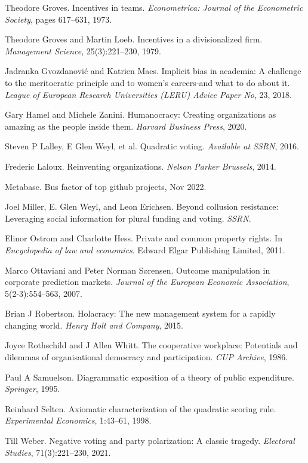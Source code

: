 \documentclass{article}
\begin{document}
\begin{thebibliography}{99}
Theodore Groves. Incentives in teams. \textit{Econometrica: Journal of the Econometric Society}, pages 617--631, 1973.

Theodore Groves and Martin Loeb. Incentives in a divisionalized firm. \textit{Management Science}, 25(3):221--230, 1979.

Jadranka Gvozdanović and Katrien Maes. Implicit bias in academia: A challenge to the meritocratic principle and to women's careers-and what to do about it. \textit{League of European Research Universities (LERU) Advice Paper No}, 23, 2018.

Gary Hamel and Michele Zanini. Humanocracy: Creating organizations as amazing as the people inside them. \textit{Harvard Business Press}, 2020.

Steven P Lalley, E Glen Weyl, et al. Quadratic voting. \textit{Available at SSRN}, 2016.

Frederic Laloux. Reinventing organizations. \textit{Nelson Parker Brussels}, 2014.

Metabase. Bus factor of top github projects, Nov 2022.

Joel Miller, E. Glen Weyl, and Leon Erichsen. Beyond collusion resistance: Leveraging social information for plural funding and voting. \textit{SSRN}.

Elinor Ostrom and Charlotte Hess. Private and common property rights. In \textit{Encyclopedia of law and economics}. Edward Elgar Publishing Limited, 2011.

Marco Ottaviani and Peter Norman Sørensen. Outcome manipulation in corporate prediction markets. \textit{Journal of the European Economic Association}, 5(2-3):554--563, 2007.

Brian J Robertson. Holacracy: The new management system for a rapidly changing world. \textit{Henry Holt and Company}, 2015.

Joyce Rothschild and J Allen Whitt. The cooperative workplace: Potentials and dilemmas of organisational democracy and participation. \textit{CUP Archive}, 1986.

Paul A Samuelson. Diagrammatic exposition of a theory of public expenditure. \textit{Springer}, 1995.

Reinhard Selten. Axiomatic characterization of the quadratic scoring rule. \textit{Experimental Economics}, 1:43--61, 1998.

Till Weber. Negative voting and party polarization: A classic tragedy. \textit{Electoral Studies}, 71(3):221--230, 2021.
\end{thebibliography}
\end{document}
